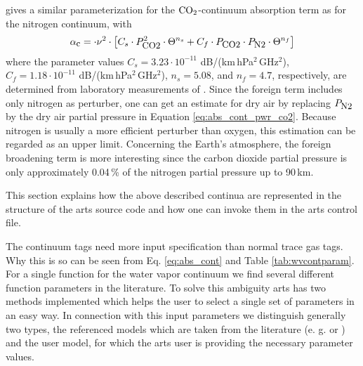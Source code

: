 \label{levelc:co2cont}
\citet{pwr:93} gives a similar parameterization for the $\mbox{CO}_2$-continuum 
absorption term as for the nitrogen continuum, with 
\begin{equation}
  \label{eq:abs_cont_pwr_co2}
    \alpha_{\mbox{\small c}} =   \cdot \nu^2 \cdot  
                \left[ C_s \cdot P_{\mbox{\rm \small CO2}}^2           \cdot \Theta^{n_s} +
                       C_f \cdot P_{\mbox{\rm \small CO2}}  \cdot P_{\mbox{\rm \small N2}} \cdot \Theta^{n_f} \right]
\end{equation}
where the parameter values $C_s = 3.23\cdot 10^{-11}$
dB/(km\,hPa$^2$\,GHz$^2$), $C_f = 1.18\cdot 10^{-11}$
dB/(km\,hPa$^2$\,GHz$^2$), $n_s=5.08$, and $n_f=4.7$, respectively, 
are determined from laboratory measurements of \cite{ho:66,dagg:75}. 
Since the foreign term
includes only nitrogen as perturber, one can get an estimate for dry
air by replacing $P_{\mbox{\rm \small N2}}$ by the dry air partial pressure in
Equation \ref{eq:abs_cont_pwr_co2}. Because nitrogen is usually a more
efficient perturber than oxygen, this estimation can be regarded as an
upper limit. Concerning the Earth's atmosphere, the foreign broadening
term is more interesting since the carbon dioxide partial pressure is
only approximately 0.04\,\% of the nitrogen partial pressure up to
90\,km.




\label{levelc:ArtsImplementationContinuum}

This section explains how the above described continua are represented 
in the structure of the arts source code and how one can invoke them in 
the arts control file.

The continuum tags need more input specification than normal trace gas
tags. Why this is so can be seen from Eq. \ref{eq:abs_cont} and 
Table \ref{tab:wvcontparam}. For a single function for the water vapor 
continuum we find several different function parameters in the literature. 
To solve this ambiguity arts has two methods implemented which helps 
the user to select a single set of parameters in an easy way. 
In connection with this input parameters we distinguish generally two 
types, the referenced models which are taken from the literature 
(e. g. \cite{liebeetal:93} or \cite{pwr:93}) and the user model, 
for which the arts user is providing the necessary parameter values.

